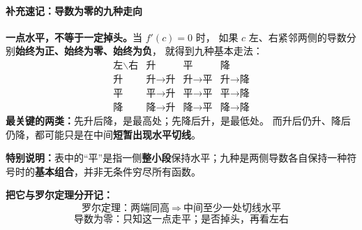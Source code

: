 \clearpage
\begin{summarybox}
\paragraph{补充速记：导数为零的九种走向}

\textbf{一点水平，不等于一定掉头。}当 $f'(c)=0$ 时，
如果 $c$ 左、右紧邻两侧的导数分别\textbf{始终为正、始终为零、始终为负}，
就得到九种基本走法：
\[
\begin{array}{c|ccc}
\text{左}\backslash\text{右}&\text{升}&\text{平}&\text{降}\\ \hline
\text{升}&\text{升}\to\text{升}&\text{升}\to\text{平}&\boxed{\text{升}\to\text{降}}\\
\text{平}&\text{平}\to\text{升}&\text{平}\to\text{平}&\text{平}\to\text{降}\\
\text{降}&\boxed{\text{降}\to\text{升}}&\text{降}\to\text{平}&\text{降}\to\text{降}
\end{array}
\]
\textbf{最关键的两类：}先升后降，是最高处；先降后升，是最低处。
而升后仍升、降后仍降，都可能只是在中间\textbf{短暂出现水平切线}。

\textbf{特别说明：}表中的``平''是指一侧\textbf{整小段}保持水平；九种是两侧导数各自保持一种符号时的\textbf{基本组合}，并非无条件穷尽所有函数。

\textbf{把它与罗尔定理分开记：}
\[
\boxed{\text{罗尔定理：两端同高}\ \Rightarrow\ \text{中间至少一处切线水平}}
\]
\[
\boxed{\text{导数为零：只知这一点走平；是否掉头，再看左右}}
\]
\end{summarybox}
